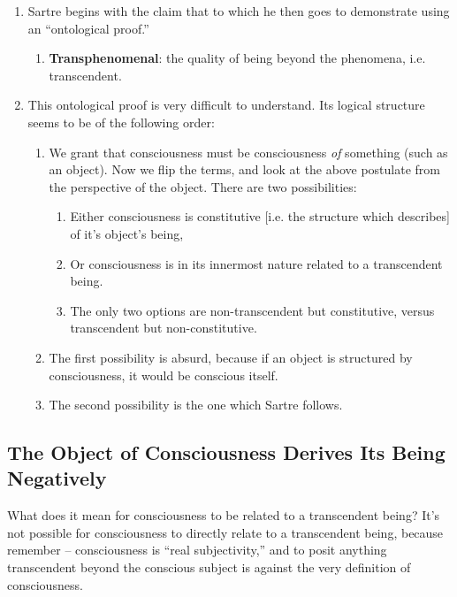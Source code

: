 \begin{enumerate}
  \item Sartre begins with the claim that  to which he then goes to demonstrate using an \enquote{ontological proof.}
  \begin{enumerate}
    \item \textbf{Transphenomenal}: the quality of being beyond the phenomena, i.e. transcendent.
  \end{enumerate}
  \item This ontological proof is very difficult to understand. Its logical structure seems to be of the following order:
  \begin{enumerate}
    \item We grant that consciousness must be consciousness \emph{of} something (such as an object). Now we flip the terms, and look at the above postulate from the perspective of the object. There are two possibilities:
    \begin{enumerate}
      \item Either consciousness is constitutive [i.e. the structure which describes] of it's object's being,
      \item Or consciousness is in its innermost nature related to a transcendent being.
      \item The only two options are non-transcendent but constitutive, versus transcendent but non-constitutive.
    \end{enumerate}
    \item The first possibility is absurd, because if an object is structured by consciousness, it would be conscious itself.
    \item The second possibility is the one which Sartre follows.
  \end{enumerate}
\end{enumerate}

\subsection{The Object of Consciousness Derives Its Being Negatively}

What does it mean for consciousness to be related to a transcendent being? It's not possible for consciousness to directly relate to a transcendent being, because remember -- consciousness is \enquote{real subjectivity,} and to posit anything transcendent beyond the conscious subject is against the very definition of consciousness. 

